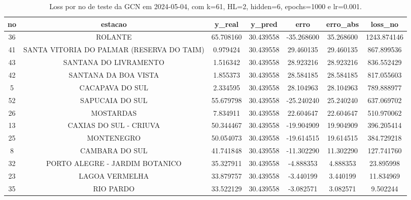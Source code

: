 \begin{table}[h]
\centering
\caption{Loss por no de teste da GCN em 2024-05-04, com k=61, HL=2, hidden=6, epochs=1000 e lr=0.001.}
\label{tab:gcn_loss_k61_hl2_h6_e1000_d20240504}
\begin{tabular}{ccccccc}
\toprule
no & estacao & y\_real & y\_pred & erro & erro\_abs & loss\_no \\
\midrule
36 & ROLANTE & 65.708160 & 30.439558 & -35.268600 & 35.268600 & 1243.874146 \\
41 & SANTA VITORIA DO PALMAR (RESERVA DO TAIM) & 0.979424 & 30.439558 & 29.460135 & 29.460135 & 867.899536 \\
43 & SANTANA DO LIVRAMENTO & 1.516342 & 30.439558 & 28.923216 & 28.923216 & 836.552429 \\
42 & SANTANA DA BOA VISTA & 1.855373 & 30.439558 & 28.584185 & 28.584185 & 817.055603 \\
5 & CACAPAVA DO SUL & 2.334595 & 30.439558 & 28.104963 & 28.104963 & 789.888977 \\
52 & SAPUCAIA DO SUL & 55.679798 & 30.439558 & -25.240240 & 25.240240 & 637.069702 \\
26 & MOSTARDAS & 7.834911 & 30.439558 & 22.604647 & 22.604647 & 510.970062 \\
13 & CAXIAS DO SUL - CRIUVA & 50.344467 & 30.439558 & -19.904909 & 19.904909 & 396.205414 \\
25 & MONTENEGRO & 50.054073 & 30.439558 & -19.614515 & 19.614515 & 384.729218 \\
8 & CAMBARA DO SUL & 41.741848 & 30.439558 & -11.302290 & 11.302290 & 127.741760 \\
32 & PORTO ALEGRE - JARDIM BOTANICO & 35.327911 & 30.439558 & -4.888353 & 4.888353 & 23.895998 \\
23 & LAGOA VERMELHA & 33.879757 & 30.439558 & -3.440199 & 3.440199 & 11.834969 \\
35 & RIO PARDO & 33.522129 & 30.439558 & -3.082571 & 3.082571 & 9.502244 \\
\bottomrule
\end{tabular}
\end{table}
